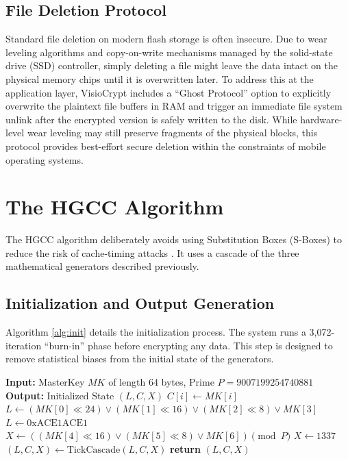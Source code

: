 \documentclass[runningheads]{llncs}
\begin{document}
\subsection{File Deletion Protocol}
Standard file deletion on modern flash storage is often insecure. Due to wear leveling algorithms and copy-on-write mechanisms managed by the solid-state drive (SSD) controller, simply deleting a file might leave the data intact on the physical memory chips until it is overwritten later. To address this at the application layer, VisioCrypt includes a ``Ghost Protocol'' option to explicitly overwrite the plaintext file buffers in RAM and trigger an immediate file system unlink after the encrypted version is safely written to the disk. While hardware-level wear leveling may still preserve fragments of the physical blocks, this protocol provides best-effort secure deletion within the constraints of mobile operating systems.

\section{The HGCC Algorithm}
The HGCC algorithm deliberately avoids using Substitution Boxes (S-Boxes) to reduce the risk of cache-timing attacks \cite{kocher1996}. It uses a cascade of the three mathematical generators described previously.

\subsection{Initialization and Output Generation}
Algorithm \ref{alg:init} details the initialization process. The system runs a 3,072-iteration ``burn-in'' phase before encrypting any data. This step is designed to remove statistical biases from the initial state of the generators.

\begin{algorithm}
\caption{HGCC Initialization}\label{alg:init}
\begin{algorithmic}[1]
\Statex \textbf{Input:} MasterKey $MK$ of length 64 bytes, Prime $P = 9007199254740881$
\Statex \textbf{Output:} Initialized State $(L, C, X)$
    \State $C[i] \gets MK[i]$
\EndFor
\State $L \gets (MK[0] \ll 24) \lor (MK[1] \ll 16) \lor (MK[2] \ll 8) \lor MK[3]$
    \State $L \gets \text{0xACE1ACE1}$
\EndIf
\State $X \gets ((MK[4] \ll 16) \lor (MK[5] \ll 8) \lor MK[6]) \pmod P$
    \State $X \gets 1337$
\EndIf
{}
    \State $(L, C, X) \gets \text{TickCascade}(L, C, X)$
\EndFor
\State \textbf{return} $(L, C, X)$
\end{algorithmic}
\end{algorithm}
\end{document}
